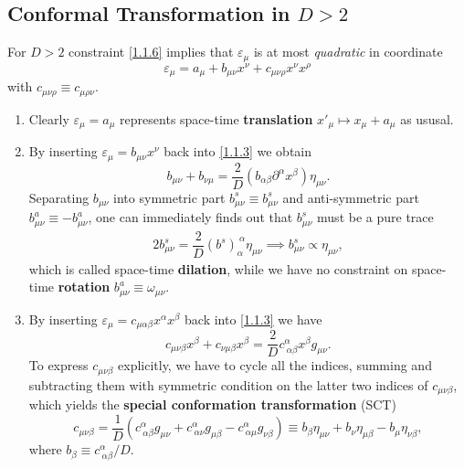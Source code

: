 \documentclass[10pt,nofootinbib]{revtex4}
\begin{document}
	\subsection{Conformal Transformation in $D>2$}
		For $D>2$ constraint \eqref{1.1.6} implies that $\varepsilon_\mu$ is at most \emph{quadratic} in coordinate
		\begin{equation*}
			\varepsilon_\mu=a_\mu+b_{\mu\nu}x^\nu+c_{\mu\nu\rho}x^\nu x^\rho
		\end{equation*}
		with $c_{\mu\nu\rho}\equiv c_{\mu\rho\nu}$.\par
		\begin{enumerate}[1)]
			\item Clearly $\varepsilon_\mu=a_\mu$ represents space-time \textbf{translation} $x'_\mu\mapsto x_\mu+a_\mu$ as ususal.
			\item By inserting $\varepsilon_\mu=b_{\mu\nu}x^\nu$ back into \eqref{1.1.3} we obtain
				\begin{equation*}
					b_{\mu\nu}+b_{\nu\mu}=\dfrac{2}{D}(b_{\alpha\beta} \partial^\alpha x^\beta)\eta_{\mu\nu}.
				\end{equation*}
				Separating $b_{\mu\nu}$ into symmetric part $b^s_{\mu\nu}\equiv b^s_{\mu\nu}$ and anti-symmetric part $b^a_{\mu\nu}\equiv-b^a_{\mu\nu}$, one can immediately finds out that $b^s_{\mu\nu}$ must be a pure trace
				\begin{align*}
					2b^s_{\mu\nu}=\dfrac{2}{D}(b^s)_{\alpha}^{~\alpha}\eta_{\mu\nu}\implies b^s_{\mu\nu}\propto\eta_{\mu\nu},
				\end{align*}
				which is called space-time \textbf{dilation}, while we have no constraint on space-time \textbf{rotation} $b^a_{\mu\nu}\equiv\omega_{\mu\nu}$.
			\item By inserting $\varepsilon_\mu=c_{\mu \alpha\beta}x^\alpha x^\beta$ back into \eqref{1.1.3} we have
				\begin{equation*}
					c_{\mu\nu\beta}x^\beta+c_{\nu\mu\beta}x^\beta=\dfrac{2}{D}c^\alpha_{~\alpha\beta}x^\beta g_{\mu\nu}.
				\end{equation*}
				To express $c_{\mu\nu\beta}$ explicitly, we have to cycle all the indices, summing and subtracting them with symmetric condition on the latter two indices of $c_{\mu\nu\beta}$, which yields the \textbf{special conformation transformation} (SCT)
				\begin{equation*}
					c_{\mu\nu\beta}=\dfrac{1}{D}(c^\alpha_{~\alpha\beta}g_{\mu\nu}+c^\alpha_{~\alpha\nu}g_{\mu\beta}-c^\alpha_{~\alpha\mu}g_{\nu\beta})\equiv b_\beta\eta_{\mu\nu}+b_\nu\eta_{\mu\beta}-b_\mu\eta_{\nu\beta},
				\end{equation*}
				where $b_\beta\equiv c^\alpha_{~\alpha\beta}/D$.
		\end{enumerate}
\end{document}
